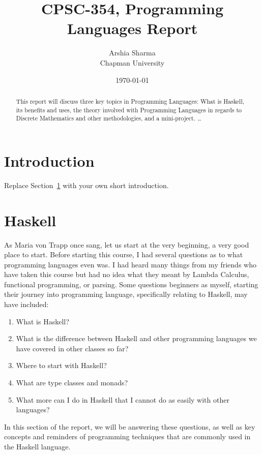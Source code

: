 \documentclass{article}
\title{CPSC-354, Programming Languages Report}
\author{Arshia Sharma \\ Chapman University}
\date{\today}
\begin{document}
\maketitle

\begin{abstract}
This report will discuss three key topics in Programming Languages: What is Haskell, its benefits and uses, the theory involved with Programming Languages in regards to Discrete Mathematics and other methodologies, and a mini-project.  \ldots 
\end{abstract}

\tableofcontents

\section{Introduction}\label{intro}

Replace Section~\ref{intro} with your own short introduction. 

\section{Haskell}\label{haskell}

As Maria von Trapp once sang, let us start at the very beginning, a very good place to start. Before starting this course, I had several questions as to what programming languages even was. I had heard many things from my friends who have taken this course but had no idea what they meant by Lambda Calculus, functional programming, or parsing. Some questions beginners as myself, starting their journey into programming language, specifically relating to Haskell, may have included:
\begin{enumerate}
    \item What is Haskell?
    \item What is the difference between Haskell and other programming languages we have covered in other classes so far?
    \item Where to start with Haskell?
    \item What are type classes and monads?
    \item What more can I do in Haskell that I cannot do as easily with other languages?
    
\end{enumerate}
\noindent
In this section of the report, we will be answering these questions, as well as key concepts and reminders of programming techniques that are commonly used in the Haskell language.
\end{document}
